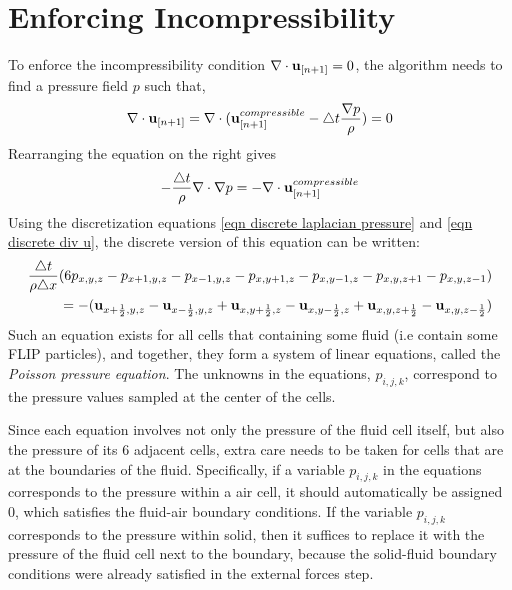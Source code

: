 \section{Enforcing Incompressibility}
\label{section enforce incompressibility}
To enforce the incompressibility condition $\nabla \cdot \textbf{u}_{[n+1]} = 0$, the algorithm needs to find a pressure field $p$ such that,
\begin{equation*}
    \begin{aligned}
        \nabla \cdot \textbf{u}_{[n+1]} = \nabla \cdot
        ( \textbf{u}_{[n+1]}^{compressible} - \triangle t \frac{\nabla p}{\rho} ) = 0
    \end{aligned}
\end{equation*}
Rearranging the equation on the right gives
$$
-\frac{\triangle t}{\rho} \nabla \cdot \nabla p = -\nabla \cdot \textbf{u}_{[n+1]}^{compressible}
$$
Using the discretization equations \ref{eqn discrete laplacian pressure} and \ref{eqn discrete div u}, the discrete version of this equation can be written: 
\begin{equation*}
    \begin{aligned}
        \frac{\triangle t}{\rho \triangle x}(6p_{x,y,z}-p_{x+1,y,z}-p_{x-1,y,z}-p_{x,y+1,z}-p_{x,y-1,z}-p_{x,y,z+1}-p_{x,y,z-1}) \\
        = 
        -( \textbf{u}_{x+\frac{1}{2},y,z} - \textbf{u}_{x-\frac{1}{2},y,z}  +  
         \textbf{u}_{x,y+\frac{1}{2},z} - \textbf{u}_{x,y-\frac{1}{2},z} +
         \textbf{u}_{x,y,z+\frac{1}{2}} - \textbf{u}_{x,y,z-\frac{1}{2}})
    \end{aligned}
\end{equation*}
Such an equation exists for all cells that containing some fluid (i.e contain some FLIP particles), and together, they form a system of linear equations, called the \textit{Poisson pressure equation}. The unknowns in the equations, $p_{i,j,k}$, correspond to the pressure values sampled at the center of the cells.

Since each equation involves not only the pressure of the fluid cell itself, but also the pressure of its 6 adjacent cells, extra care needs to be taken for cells that are at the boundaries of the fluid. Specifically, if a variable $p_{i,j,k}$ in the equations corresponds to the pressure within a air cell, it should automatically be assigned 0, which satisfies the fluid-air boundary conditions. If the variable $p_{i,j,k}$ corresponds to the pressure within solid, then it suffices to replace it with the pressure of the fluid cell next to the boundary, because the solid-fluid boundary conditions were already satisfied in the external forces step.

